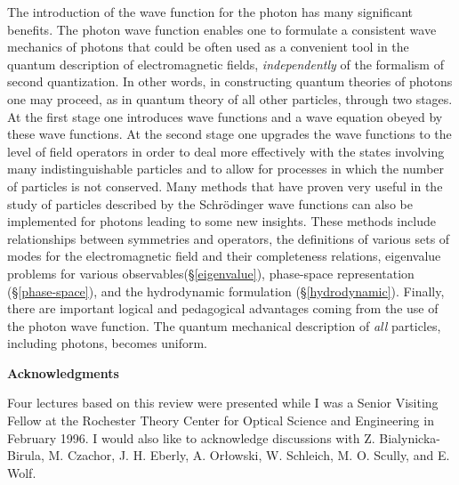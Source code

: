\documentclass[11pt]{article}
\begin{document}
The introduction of the wave function for the photon has many significant
benefits. The photon wave function enables one to formulate a consistent
wave mechanics of photons that could be often used as a convenient tool in
the quantum description of electromagnetic fields, {\em independently} of
the formalism of second quantization. In other words, in constructing
quantum theories of photons one may proceed, as in quantum theory of all
other particles, through two stages. At the first stage one introduces wave
functions and a wave equation obeyed by these wave functions. At the second
stage one upgrades the wave functions to the level of field operators in
order to deal more effectively with the states involving many
indistinguishable particles and to allow for processes in which the number
of particles is not conserved. Many methods that have proven very useful in
the study of particles described by the Schr\"odinger wave functions can
also be implemented for photons leading to some new insights. These methods
include relationships between symmetries and operators, the definitions of
various sets of modes for the electromagnetic field and their completeness
relations, eigenvalue problems for various observables(\S \ref{eigenvalue}),
phase-space representation (\S \ref{phase-space}), and
the hydrodynamic formulation (\S \ref{hydrodynamic}). Finally, there are
important logical and pedagogical advantages coming from the use of the
photon wave function. The quantum mechanical description of {\em all}
particles, including photons, becomes uniform.

\vspace{.5cm}
\centerline{\bf Acknowledgments}
\vspace{.5cm}

Four lectures based on this review were presented while I was a Senior
Visiting Fellow at the Rochester Theory Center for Optical Science and
Engineering in February 1996. I would also like to acknowledge discussions
with Z. Bialynicka-Birula, M. Czachor, J. H. Eberly, A. Or\l owski, W.
Schleich, M. O. Scully, and E. Wolf.
\end{document}
